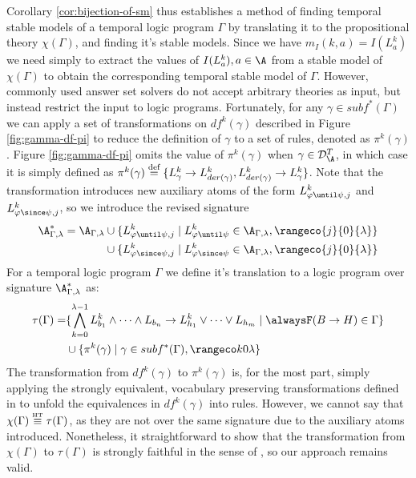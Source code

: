Corollary \ref{cor:bijection-of-sm} thus establishes a method of
finding temporal stable models of a temporal logic program $\Gamma$ by
translating it to the propositional theory $\chi(\Gamma)$, and finding
it's stable models. Since we have $m_I(k,a)=I(L_a^k)$ we need simply
to extract the values of $I(L_a^k), a\in \A$ from a stable model of
$\chi(\Gamma)$ to obtain the corresponding temporal stable model of
$\Gamma$. However, commonly used answer set solvers do not accept
arbitrary theories as input, but instead restrict the input to logic
programs. Fortunately, for any $\gamma \in subf^*(\Gamma)$ we can
apply a set of transformations on $df^k(\gamma)$ described in Figure
\ref{fig:gamma-df-pi} to reduce the definition of $\gamma$ to a set of
rules, denoted as $\pi^k(\gamma)$. Figure \ref{fig:gamma-df-pi} omits
the value of $\pi^k(\gamma)$ when $\gamma \in \mathcal{D}_{\A}^{T}$,
in which case it is simply defined as
$\pi^k(\gamma) \stackrel{\text{def}}{=} \{ L^k_{\gamma} \rightarrow L^k_{der(\gamma)},
L^k_{der(\gamma)} \rightarrow L^k_{\gamma} \}$. Note that the
transformation introduces new auxiliary atoms of the form
$L^k_{\varphi \until \psi,j}$ and $L^k_{\varphi \since \psi,j}$, so we
introduce the revised signature
\begin{align*}
\A_{\Gamma,\lambda}^* = \A_{\Gamma,\lambda} 
&\cup \{ L^k_{\varphi \until \psi,j} \mid L^k_{\varphi \until \psi} \in \A_{\Gamma,\lambda}, \rangeco{j}{0}{\lambda} \}\\
&\cup \{ L^k_{\varphi \since \psi,j} \mid L^k_{\varphi \since \psi} \in \A_{\Gamma,\lambda}, \rangeco{j}{0}{\lambda} \}
\end{align*}
For a temporal logic program $\Gamma$ we define it's translation to a logic
program over signature $\A_{\Gamma,\lambda}^*$ as:
\begin{align*}
  \tau(\Gamma)  = &\{ \bigwedge_{k=0}^{\lambda-1} L_{b_1}^k \land \dots \land L_{b_n}
                    \rightarrow L_{h_1}^k \lor \dots \lor L_{h_m} \mid \tempruleshort \in \Gamma \} \\
                  & \cup \{ \pi^k(\gamma) \mid \gamma \in subf^*(\Gamma), \kinlambda \}
\end{align*}
The transformation from $df^k(\gamma)$ to $\pi^k(\gamma)$ is, for the
most part, simply applying the strongly equivalent, vocabulary
preserving transformations defined in \cite{capeva05a} to unfold the
equivalences in $df^k(\gamma)$ into rules. However, we cannot say that
$\chi(\Gamma) \stackrel{\normalfont\mbox{\tiny HT}}{\equiv} \tau(\Gamma)$, as they are not over the same
signature due to the auxiliary atoms introduced. Nonetheless, it
straightforward to show that the transformation from $\chi(\Gamma)$ to
$\tau(\Gamma)$ is strongly faithful in the sense of \cite{capeva05a},
so our approach remains valid.

